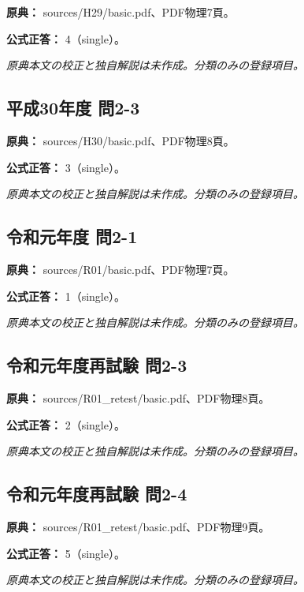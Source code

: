 \noindent\textbf{原典：} sources/H29/basic.pdf、PDF物理7頁。

\textbf{公式正答：} 4（single）。

\par\textit{原典本文の校正と独自解説は未作成。分類のみの登録項目。}

\subsection{平成30年度 問2-3}
\label{q:h30-reg-basic-2-3}

\noindent\textbf{原典：} sources/H30/basic.pdf、PDF物理8頁。

\textbf{公式正答：} 3（single）。

\par\textit{原典本文の校正と独自解説は未作成。分類のみの登録項目。}

\subsection{令和元年度 問2-1}
\label{q:r01-reg-basic-2-1}

\noindent\textbf{原典：} sources/R01/basic.pdf、PDF物理7頁。

\textbf{公式正答：} 1（single）。

\par\textit{原典本文の校正と独自解説は未作成。分類のみの登録項目。}

\subsection{令和元年度再試験 問2-3}
\label{q:r01-ret-basic-2-3}

\noindent\textbf{原典：} sources/R01\_retest/basic.pdf、PDF物理8頁。

\textbf{公式正答：} 2（single）。

\par\textit{原典本文の校正と独自解説は未作成。分類のみの登録項目。}

\subsection{令和元年度再試験 問2-4}
\label{q:r01-ret-basic-2-4}

\noindent\textbf{原典：} sources/R01\_retest/basic.pdf、PDF物理9頁。

\textbf{公式正答：} 5（single）。

\par\textit{原典本文の校正と独自解説は未作成。分類のみの登録項目。}


